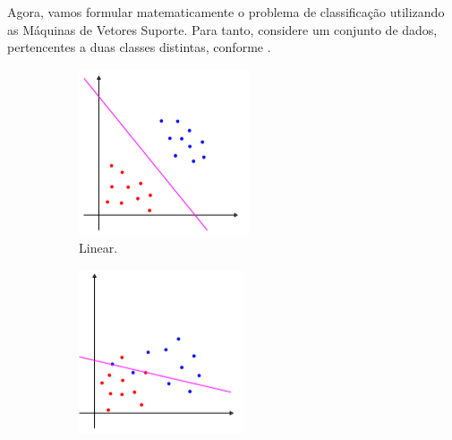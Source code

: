\documentclass[12pt,a4paper]{scrartcl}
\theoremstyle{definition}%
\begin{document}
Agora, vamos formular matematicamente o problema de classificação utilizando as Máquinas de Vetores Suporte. Para tanto, considere um conjunto de dados, pertencentes a duas classes distintas, conforme .


\begin{figure}[!h] 
\centering
\begin{subfigure}[h]{0.3\textwidth}
\centering
\includegraphics[width=\textwidth]{SVM_linear}
\caption{Linear. \label{fig1:a}}
\end{subfigure}
\begin{subfigure}[!h]{0.3\textwidth}
	\centering
	\includegraphics[width=\textwidth]{SVM_flexivel}

\end{subfigure}
\end{figure}
\end{document}
